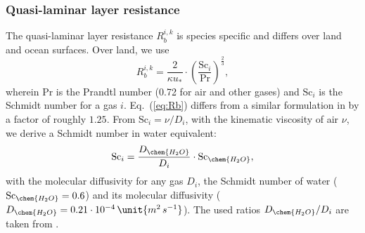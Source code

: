\documentclass[gmd, manuscript]{copernicus}
\begin{document}
\subsubsection{Quasi-laminar layer resistance}
\label{subsubsec:Rb}
The quasi-laminar layer resistance $R_b^{i,k}$ is species specific and differs over land and ocean surfaces.
Over land, we use \citep[Eq.~(53),][]{ACP:Simpson2012}
\begin{equation}
  R_b^{i,k} = \frac{2}{\kappa u_*} \cdot \left(\frac{\text{Sc}_i}{\text{Pr}}\right)^{\frac{2}{3}},
  \label{eq:Rb}
\end{equation}
wherein $\text{Pr}$ is the Prandtl number (0.72 for air and other gases) and $\text{Sc}_i$ is the Schmidt number for a gas $i$. Eq.~(\ref{eq:Rb}) differs from a similar formulation in \citet{ACP:Seinfeld2006} by a factor of roughly $1.25$. From $\text{Sc}_i = \nu/D_i$, with the kinematic viscosity of air $\nu$, we derive a Schmidt number in water equivalent:
\begin{equation}
  \text{Sc}_i = \frac{D_\chem{H_2O}}{D_i} \cdot \text{Sc}_\chem{H_2O},
\end{equation}
with the molecular diffusivity for any gas $D_i$, the Schmidt number of water ($\text{Sc}_\chem{H_2O}=0.6$) and its molecular diffusivity ($D_\chem{H_2O}=0.21\cdot10^{-4}\,\unit{m^2\,s^{-1}}$). The used ratios $D_\chem{H_2O}/D_i$ are taken from \citet[][Table S18]{ACP:Simpson2012}.\\
\end{document}
